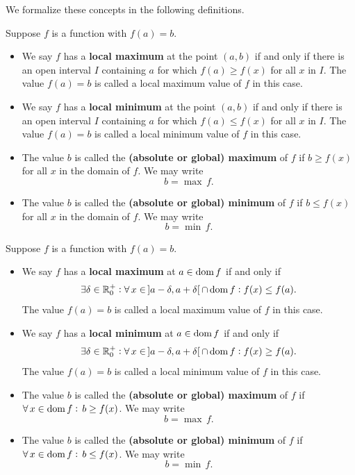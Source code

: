 We formalize these concepts in the following definitions.
\ifcalculus
\begin{definition}\label{defmaxmin}
Suppose $f$ is a function with $f(a) = b$.
\vspace{-0.3cm}
\begin{itemize}
		
	\item  We say $f$ has a \textbf{local maximum} at the point $(a,b)$ if and only if there is an open interval $I$ containing $a$ for which $f(a) \geq f(x)$ for all $x$ in $I$.  The value $f(a) = b$ is called a  local maximum value of $f$ in this case. 
		
	\item  We say $f$ has a \textbf{local minimum} at the point $(a,b)$ if and only if there is an open interval $I$ containing $a$ for which $f(a) \leq f(x)$ for all $x$ in $I$.  The value $f(a) = b$ is called a  local minimum value of $f$ in this case. 
		
	\item  The value $b$ is called the \textbf{(absolute or global) maximum} of $f$ if $b \geq f(x)$ for all $x$ in the domain of $f$. We may write
	$$
	b=\displaystyle\max_{}\,f.
	$$
		
	\item  The value $b$ is called the \textbf{(absolute or global) minimum} of $f$ if $b \leq f(x)$ for all $x$ in the domain of $f$. We may write
	$$
	b=\displaystyle\min_{}\,f.
	$$
\end{itemize}
\end{definition}
\fi

\ifanalysis
\begin{definition}\label{defmaxmin}
Suppose $f$ is a function with $f(a) = b$.
\vspace{-0.3cm}
\begin{itemize}
		
	\item  We say $f$ has a \textbf{local maximum} at $a\in\text{dom}{\,}f$ if and only if 
	$$\exists \delta\in\mathbb{R}^+_0:\forall\,x\in\,]a-\delta,a+\delta[\,\cap\,\text{dom}{\,}f: f(x)\leq f(a).$$
	  The value $f(a) = b$ is called a  local maximum value of $f$ in this case. 
		
	\item  We say $f$ has a \textbf{local minimum} at $a\in\text{dom}{\,}f$ if and only if 
	$$\exists \delta\in\mathbb{R}^+_0:\forall\,x\in\,]a-\delta,a+\delta[\,\cap\,\text{dom}{\,}f: f(x)\geq f(a).$$ The value $f(a) = b$ is called a  local minimum value of $f$ in this case. 
		
	\item  The value $b$ is called the \textbf{(absolute or global) maximum} of $f$ if $\forall\,x\in\text{dom}{\,}f:\,b \geq f(x)$. We may write
	$$
	b=\displaystyle\max_{}\,f.
	$$
		
	\item  The value $b$ is called the \textbf{(absolute or global) minimum} of $f$ if $\forall\,x\in\text{dom}{\,}f:\,b \leq f(x)$. We may write
	$$
	b=\displaystyle\min_{}\,f.
	$$
\end{itemize}
\end{definition}
\fi

